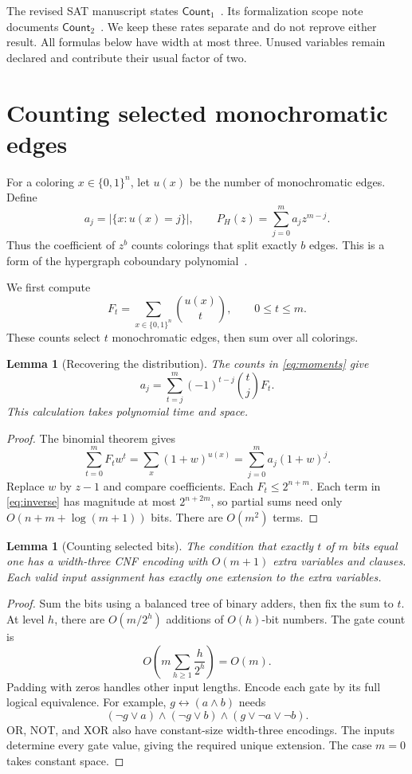 \documentclass[11pt]{article}
\newtheorem{lemma}[theorem]{Lemma}
\theoremstyle{definition}
\newcommand{\Count}{\mathsf{Count}}
\newcommand{\bits}{\{0,1\}}
\begin{document}
The revised SAT manuscript states $\Count_1$~\cite{SAT26}.
Its formalization scope note documents $\Count_2$~\cite{Scope26}.
We keep these rates separate and do not reprove either result.
All formulas below have width at most three.
Unused variables remain declared and contribute their usual factor of two.

\section{Counting selected monochromatic edges}

For a coloring $x\in\bits^n$, let $u(x)$ be the number of monochromatic
edges. Define
\[
 a_j=|\{x:u(x)=j\}|,\qquad
 P_H(z)=\sum_{j=0}^m a_j z^{m-j}.
\]
Thus the coefficient of $z^b$ counts colorings that split exactly $b$ edges.
This is a form of the hypergraph coboundary polynomial~\cite{White11}.

We first compute
\begin{equation}\label{eq:moments}
 F_t=\sum_{x\in\bits^n}\binom{u(x)}t,\qquad 0\le t\le m.
\end{equation}
These counts select $t$ monochromatic edges, then sum over all colorings.

\begin{lemma}[Recovering the distribution]\label{lem:inverse}
The counts in \eqref{eq:moments} give
\begin{equation}\label{eq:inverse}
 a_j=\sum_{t=j}^m(-1)^{t-j}\binom tj F_t.
\end{equation}
This calculation takes polynomial time and space.
\end{lemma}
\begin{proof}
The binomial theorem gives
\[
 \sum_{t=0}^m F_t w^t
 =\sum_x(1+w)^{u(x)}
 =\sum_{j=0}^m a_j(1+w)^j.
\]
Replace $w$ by $z-1$ and compare coefficients.
Each $F_t\le2^{n+m}$.
Each term in \eqref{eq:inverse} has magnitude at most $2^{n+2m}$, so
partial sums need only $O(n+m+\log(m+1))$ bits.
There are $O(m^2)$ terms.
\end{proof}

\begin{lemma}[Counting selected bits]\label{lem:adder}
The condition that exactly $t$ of $m$ bits equal one has a width-three
CNF encoding with $O(m+1)$ extra variables and clauses.
Each valid input assignment has exactly one extension to the extra variables.
\end{lemma}
\begin{proof}
Sum the bits using a balanced tree of binary adders, then fix the sum to $t$.
At level $h$, there are $O(m/2^h)$ additions of $O(h)$-bit numbers.
The gate count is
\[
 O\!\left(m\sum_{h\ge1}\frac{h}{2^h}\right)=O(m).
\]
Padding with zeros handles other input lengths.
Encode each gate by its full logical equivalence.
For example, $g\leftrightarrow(a\wedge b)$ needs
\[
 (\neg g\vee a)\wedge(\neg g\vee b)\wedge(g\vee\neg a\vee\neg b).
\]
OR, NOT, and XOR also have constant-size width-three encodings.
The inputs determine every gate value, giving the required unique extension.
The case $m=0$ takes constant space.
\end{proof}
\end{document}
